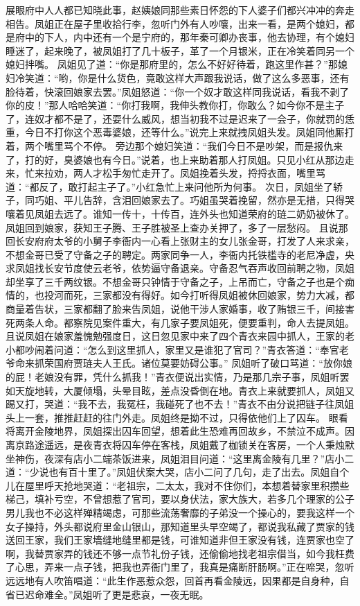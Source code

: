 \documentclass[12pt,oneside]{book}
\begin{document}
展眼府中人人都已知晓此事，赵姨娘同那些素日怀怨的下人婆子们都兴冲冲的奔走相告。凤姐正在屋子里收拾行李，忽听门外有人吵嚷，出来一看，是两个媳妇，都是府中的下人，内中还有一个是宁府的，那年秦可卿办丧事，他去协理，有个媳妇睡迷了，起来晚了，被凤姐打了几十板子，革了一个月银米，正在冷笑着同另一个媳妇拌嘴。
凤姐见了道：“你是那府里的，怎么不好好待着，跑这里作甚？”那媳妇冷笑道：“哟，你是什么货色，竟敢这样大声跟我说话，做了这么多恶事，还有脸待着，快滚回娘家去罢。”凤姐怒道：“你一个奴才敢这样同我说话，看我不剥了你的皮！”那人哈哈笑道：“你打我啊，我伸头教你打，你敢么？如今你不是主子了，连奴才都不是了，还耍什么威风，想当初我不过是迟来了一会子，你就罚的恁重，今日不打你这个恶毒婆娘，还等什么。”说完上来就拽凤姐头发。凤姐同他厮打着，两个嘴里骂个不停。
旁边那个媳妇笑道：“我们今日不是吵架，而是报仇来了，打的好，臭婆娘也有今日。”说着，也上来助着那人打凤姐。只见小红从那边走来，忙来拉劝，两人才松手匆忙走开了。凤姐挽着头发，捋捋衣面，嘴里骂道：“都反了，敢打起主子了。”小红急忙上来问他所为何事。
次日，凤姐坐了轿子，同巧姐、平儿告辞，含泪回娘家去了。巧姐虽哭着挽留，然亦是无措，只得哭嚷着见凤姐去远了。谁知一传十，十传百，连外头也知道荣府的琏二奶奶被休了。凤姐回到娘家，获知王子腾、王子胜被圣上查办关押了，多了一层愁闷。
且说那回长安府府太爷的小舅子李衙内一心看上张财主的女儿张金哥，打发了人来求亲，不想金哥已受了守备之子的聘定。两家同争一人，李衙内托铁槛寺的老尼净虚，央求凤姐找长安节度使云老爷，依势逼守备退亲。守备忍气吞声收回前聘之物，凤姐却坐享了三千两纹银。不想金哥只钟情于守备之子，上吊而亡，守备之子也是个痴情的，也投河而死，三家都没有得好。如今打听得凤姐被休回娘家，势力大减，都商量着告状，三家都翻了脸来告凤姐，说他干涉人家婚事，收了贿银三千，间接害死两条人命。都察院见案件重大，有几家子要凤姐死，便要重判，命人去提凤姐。
且说凤姐在娘家羞愧勉强度日，这日忽见家中来了四个青衣来园中抓人，王家的老小都吵闹着问道：“怎么到这里抓人，家里又是谁犯了官司？”青衣答道：“奉官老爷命来抓荣国府贾琏夫人王氏。诸位莫要妨碍公事。”
凤姐听了破口骂道：“放你娘的屁！老娘没有罪，凭什么抓我！”青衣便说出实情，乃是那几宗子事，凤姐听罢如天旋地转，大厦倾塌，头晕目眩，差点没昏倒在地。青衣上来就要抓人，凤姐又踢又打，哭道：“我不去，我冤枉，我碰死了也不去！”青衣不由分说把链子往凤姐头上一套，推推赶赶的往门外走。凤姐终是拗不过，只得依他们上了囚车。
眼看将离开金陵地界，凤姐探出囚车回望，想着此生恐难再回故乡，不禁泣不成声。因离京路途遥远，是夜青衣将囚车停在客栈，凤姐戴了枷锁关在客房，一个人秉烛默坐神伤，夜深有店小二端茶饭进来，凤姐泪目问道：“这里离金陵有几里？”店小二道：“少说也有百十里了。”凤姐伏案大哭，店小二问了几句，走了出去。凤姐自个儿在屋里呼天抢地哭道：“老祖宗，二太太，我对不住你们，本想着替家里积攒些梯己，填补亏空，不曾想惹了官司，要以身伏法，家大族大，若多几个理家的公子男儿我也不必这样殚精竭虑，可那些流荡奢靡的子弟没一个操心的，要我这样一个女子操持，外头都说府里金山银山，那知道里头早空竭了，都说我私藏了贾家的钱送回王家，我们王家墻缝地缝里都是钱，可谁知道非但王家没有钱，连贾家也空了啊，我替贾家弄的钱还不够一点节礼份子钱，还偷偷地找老祖宗借当，如今我枉费了心思，弄来一点子钱，把我也弄衙门里了，我真是痛断肝肠啊。”正在啼哭，忽听远远地有人吹笛唱道：“此生作恶惹众怨，回首再看金陵远，因果都是自身种，自省已迟命难全。”凤姐听了更是悲哀，一夜无眠。
\end{document}
